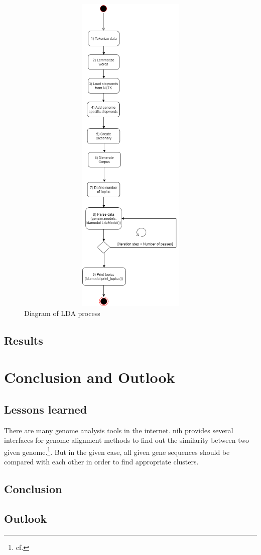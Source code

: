 \begin{figure}[htbp]
	\centering
	\includegraphics[width=1\textwidth, height=600px, keepaspectratio]{Image/LDA_central_process.png}
	\caption{Diagram of LDA process}
	\label{algorithm_figure}
\end{figure}

\section{Results}\label{results}


\chapter{Conclusion and Outlook}\label{conclusion_outlook}
\section{Lessons learned}\label{lessons_learned}

There are many genome analysis tools in the internet. \gls{nih} provides several interfaces for genome alignment methods to find out the similarity between two given genome.\footnote{cf.\autocite{blast}}.
But in the given case, all given gene sequences should be compared with each other in order to find appropriate clusters.


\section{Conclusion}\label{conclusion}
\section{Outlook}\label{outlook}	



\newpage







